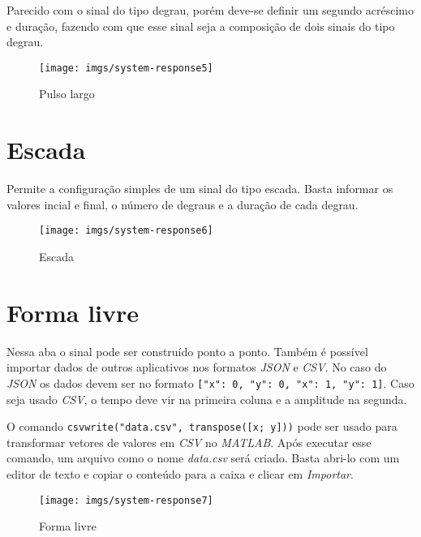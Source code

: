 Parecido com o sinal do tipo degrau, porém deve-se definir um segundo acréscimo
e duração, fazendo com que esse sinal seja a composição de dois sinais do tipo
degrau.

\begin{figure}[ht!]
    \centering
    \texttt{[image: imgs/system-response5]}
    \caption[Pulso largo]{Pulso largo}%
    \label{fig:system-response5}
\end{figure}

\newpage{}
\section{Escada}%
\label{sec:stairs}

Permite a configuração simples de um sinal do tipo escada. Basta informar os
valores incial e final, o número de degraus e a duração de cada degrau.

\begin{figure}[ht!]
    \centering
    \texttt{[image: imgs/system-response6]}
    \caption[Escada]{Escada}%
    \label{fig:system-response6}
\end{figure}

\newpage{}
\section{Forma livre}%
\label{sec:free-form}

Nessa aba o sinal pode ser construído ponto a ponto. Também é possível importar
dados de outros aplicativos nos formatos \textit{JSON} e \textit{CSV}. No caso
do \textit{JSON} os dados devem ser no formato \texttt{[{"x": 0,
"y": 0}, {"x": 1, "y": 1}]}. Caso seja usado \textit{CSV}, o tempo deve vir na
primeira coluna e a amplitude na segunda.

O comando \texttt{csvwrite("data.csv", transpose([x; y]))} pode ser
usado para transformar vetores de valores em \textit{CSV} no \textit{MATLAB}.
Após executar esse comando, um arquivo como o nome \textit{data.csv} será
criado. Basta abri-lo com um editor de texto e copiar o conteúdo para a caixa e
clicar em \textit{Importar}.

\begin{figure}[ht!]
    \centering
    \texttt{[image: imgs/system-response7]}
    \caption[Forma livre]{Forma livre}%
    \label{fig:system-response7}
\end{figure}
